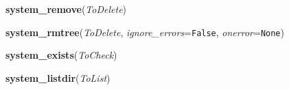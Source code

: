     \vspace{0.5ex}

\hspace{.8\funcindent}\begin{boxedminipage}{\funcwidth}

    \raggedright \textbf{system\_remove}(\textit{ToDelete})

\setlength{\parskip}{2ex}
\setlength{\parskip}{1ex}
    \end{boxedminipage}

    \label{System:system_io_override:system_rmtree}

    \vspace{0.5ex}

\hspace{.8\funcindent}\begin{boxedminipage}{\funcwidth}

    \raggedright \textbf{system\_rmtree}(\textit{ToDelete}, \textit{ignore\_errors}={\tt False}, \textit{onerror}={\tt None})

\setlength{\parskip}{2ex}
\setlength{\parskip}{1ex}
    \end{boxedminipage}

    \label{System:system_io_override:system_exists}

    \vspace{0.5ex}

\hspace{.8\funcindent}\begin{boxedminipage}{\funcwidth}

    \raggedright \textbf{system\_exists}(\textit{ToCheck})

\setlength{\parskip}{2ex}
\setlength{\parskip}{1ex}
    \end{boxedminipage}

    \label{System:system_io_override:system_listdir}

    \vspace{0.5ex}

\hspace{.8\funcindent}\begin{boxedminipage}{\funcwidth}

    \raggedright \textbf{system\_listdir}(\textit{ToList})

\setlength{\parskip}{2ex}
\setlength{\parskip}{1ex}
    \end{boxedminipage}

